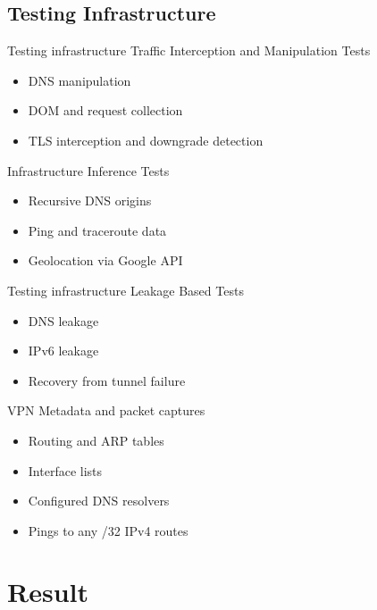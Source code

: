 \documentclass{beamer}
\begin{document}
\subsection{Testing Infrastructure}

\begin{frame}{Testing infrastructure}
  Traffic Interception and Manipulation Tests
  \begin{itemize}
    \item DNS manipulation
    \item DOM and request collection
    \item TLS interception and downgrade detection
  \end{itemize} \pause{}

  Infrastructure Inference Tests
  \begin{itemize}
    \item Recursive DNS origins
    \item Ping and traceroute data
    \item Geolocation via Google API
  \end{itemize}
\end{frame}

\begin{frame}{Testing infrastructure}
  Leakage Based Tests
  \begin{itemize}
    \item DNS leakage
    \item IPv6 leakage
    \item Recovery from tunnel failure
  \end{itemize} \pause{}

  VPN Metadata and packet captures
  \begin{itemize}
    \item Routing and ARP tables
    \item Interface lists
    \item Configured DNS resolvers
    \item Pings to any /32 IPv4 routes
  \end{itemize}

\end{frame}

\section{Result}
\end{document}
